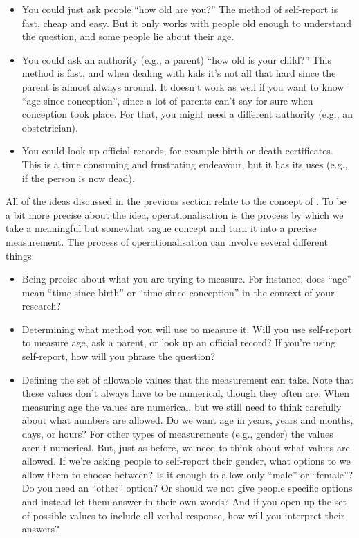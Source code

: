 \begin{itemize}
\item You could just ask people ``how old are you?'' The method of self-report is fast, cheap and easy. But it only works with people old enough to understand the question, and some people lie about their age.
\item You could ask an authority (e.g., a parent) ``how old is your child?'' This method is fast, and when dealing with kids it's not all that hard since the parent is almost always around. It doesn't work as well if you want to know ``age since conception'', since a lot of parents can't say for sure when conception took place. For that, you might need a different authority (e.g., an obstetrician). 
\item You could look up official records, for example birth or death certificates. This is a time consuming and frustrating endeavour, but it has its uses (e.g., if the person is now dead).  
\end{itemize}



All of the ideas discussed in the previous section relate to the concept of . To be a bit more precise about the idea, operationalisation is the process by which we take a meaningful but somewhat vague concept and turn it into a precise measurement. The process of operationalisation can involve several different things:

\begin{itemize}
\item Being precise about what you are trying to measure. For instance, does ``age'' mean ``time since birth'' or ``time since conception'' in the context of your research?
\item Determining what method you will use to measure it. Will you use self-report to measure age, ask a parent, or look up an official record? If you're using self-report, how will you phrase the question? 
\item Defining the set of allowable values that the measurement can take. Note that these values don't always have to be numerical, though they often are. When measuring age the values are numerical, but we still need to think carefully about what numbers are allowed. Do we want age in years, years and months, days, or hours? For other types of measurements (e.g., gender) the values aren't numerical. But, just as before, we need to think about what values are allowed. If we're asking people to self-report their gender, what options to we allow them to choose between? Is it enough to allow only ``male'' or ``female''? Do you need an ``other'' option? Or should we not give people specific options and instead let them answer in their own words? And if you open up the set of possible values to include all verbal response, how will you interpret their answers?
\end{itemize}
 
